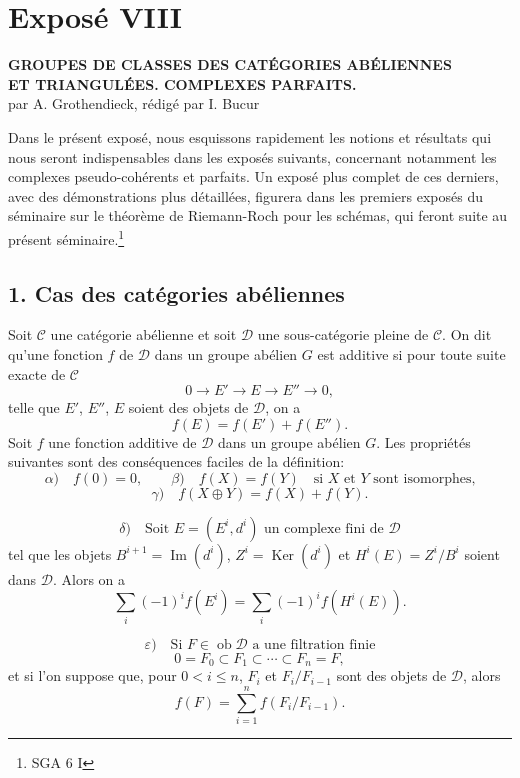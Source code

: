 \documentclass[11pt]{article}
\providecommand{\Ob}{\operatorname{ob}}
\providecommand{\cC}{\mathcal C}
\providecommand{\Ob}{\operatorname{ob}}
\providecommand{\cC}{\mathcal C}
\providecommand{\cD}{\mathcal D}
\providecommand{\Ob}{\operatorname{Ob}}
\begin{document}
\newpage
\section*{Exposé VIII}

\begin{center}
\textbf{GROUPES DE CLASSES DES CATÉGORIES ABÉLIENNES}\\
\textbf{ET TRIANGULÉES. COMPLEXES PARFAITS.}\\[1ex]
par A. Grothendieck, rédigé par I. Bucur
\end{center}

Dans le présent exposé, nous esquissons rapidement les notions et résultats qui nous seront indispensables dans les exposés suivants, concernant notamment les complexes pseudo-cohérents et parfaits. Un exposé plus complet de ces derniers, avec des démonstrations plus détaillées, figurera dans les premiers exposés du séminaire sur le théorème de Riemann-Roch pour les schémas, qui feront suite au présent séminaire.\footnote{SGA 6 I}

\subsection*{1. Cas des catégories abéliennes}

Soit $\cC$ une catégorie abélienne et soit $\cD$ une sous-catégorie pleine de $\cC$. On dit qu'une fonction $f$ de $\cD$ dans un groupe abélien $G$ est additive si pour toute suite exacte de $\cC$
\[
0\longrightarrow E'\longrightarrow E\longrightarrow E''\longrightarrow 0,
\]
telle que $E'$, $E''$, $E$ soient des objets de $\cD$, on a
\[
f(E)=f(E')+f(E'').
\]
Soit $f$ une fonction additive de $\cD$ dans un groupe abélien $G$. Les propriétés suivantes sont des conséquences faciles de la définition:
\[
\alpha)\quad f(0)=0,\qquad
\beta)\quad f(X)=f(Y)\quad\text{si }X\text{ et }Y\text{ sont isomorphes,}
\]
\[
\gamma)\quad f(X\oplus Y)=f(X)+f(Y).
\]

\[
\delta)\quad
\text{Soit }E=(E^i,d^i)\text{ un complexe fini de }\cD
\]
tel que les objets $B^{i+1}=\operatorname{Im}(d^i)$, $Z^i=\operatorname{Ker}(d^i)$ et $H^i(E)=Z^i/B^i$ soient dans $\cD$. Alors on a
\[
\sum_i (-1)^i f(E^i)=\sum_i (-1)^i f(H^i(E)).
\]

\[
\varepsilon)\quad
\text{Si }F\in\Ob \cD\text{ a une filtration finie}
\]
\[
0=F_0\subset F_1\subset\cdots\subset F_n=F,
\]
et si l'on suppose que, pour $0<i\le n$, $F_i$ et $F_i/F_{i-1}$ sont des objets de $\cD$, alors
\[
f(F)=\sum_{i=1}^n f(F_i/F_{i-1}).
\]
\end{document}
